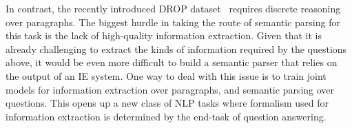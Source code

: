 In contrast, the recently introduced DROP dataset~\citep{Dua2019DROPAR}
requires discrete reasoning over paragraphs. 
The biggest hurdle in taking the route of semantic
parsing for this task is the lack of high-quality information extraction. Given that it is
already challenging to extract the kinds of information required by the
questions above, it would be even more difficult to build a semantic parser that
relies on the output of an IE system. One way to deal with this issue is to
train joint models for information extraction over paragraphs, and semantic
parsing over questions. This opens up a new class of NLP tasks where formalism
used for information extraction is determined by the end-task of question
answering.
